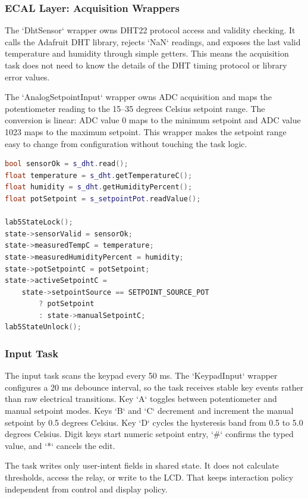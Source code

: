 \subsubsection{ECAL Layer: Acquisition Wrappers}

The `DhtSensor` wrapper owns DHT22 protocol access and validity checking. It calls the Adafruit DHT library, rejects `NaN` readings, and exposes the last valid temperature and humidity through simple getters. This means the acquisition task does not need to know the details of the DHT timing protocol or library error values.

The `AnalogSetpointInput` wrapper owns ADC acquisition and maps the potentiometer reading to the 15--35 degrees Celsius setpoint range. The conversion is linear: ADC value 0 maps to the minimum setpoint and ADC value 1023 maps to the maximum setpoint. This wrapper makes the setpoint range easy to change from configuration without touching the task logic.

\begin{lstlisting}[language=C++, caption=Acquisition task sequence, label=lst:acquisition_task]
bool sensorOk = s_dht.read();
float temperature = s_dht.getTemperatureC();
float humidity = s_dht.getHumidityPercent();
float potSetpoint = s_setpointPot.readValue();

lab5StateLock();
state->sensorValid = sensorOk;
state->measuredTempC = temperature;
state->measuredHumidityPercent = humidity;
state->potSetpointC = potSetpoint;
state->activeSetpointC =
    state->setpointSource == SETPOINT_SOURCE_POT
        ? potSetpoint
        : state->manualSetpointC;
lab5StateUnlock();
\end{lstlisting}

\subsubsection{Input Task}

The input task scans the keypad every 50 ms. The `KeypadInput` wrapper configures a 20 ms debounce interval, so the task receives stable key events rather than raw electrical transitions. Key `A` toggles between potentiometer and manual setpoint modes. Keys `B` and `C` decrement and increment the manual setpoint by 0.5 degrees Celsius. Key `D` cycles the hysteresis band from 0.5 to 5.0 degrees Celsius. Digit keys start numeric setpoint entry, `\#` confirms the typed value, and `*` cancels the edit.

The task writes only user-intent fields in shared state. It does not calculate thresholds, access the relay, or write to the LCD. That keeps interaction policy independent from control and display policy.

